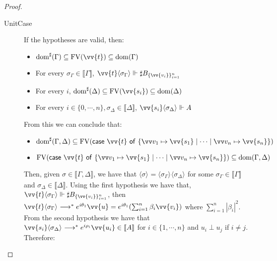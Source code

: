 \documentclass[runningheads,orivec,envcountsame,envcountsect]{llncs}
\newcommand\lra{\longrightarrow}
\newcommand\ansubst[2]{\ensuremath{\langle #1 \rangle_{#2}}}
\newcommand\dom[1]{\mathrm{dom}(#1)}
\newcommand\sdom[1]{\mathrm{dom}^{\sharp}(#1)}
\newcommand\FV[1]{\mathrm{FV}(#1)}
\def\gencase#1#2#3#4#5{\ensuremath{\mathsf{case}~#1~\mathsf{of}~\{#2\mapsto #4 \mid \dotsb \mid #3\mapsto #5\}}}
\def\eval{\lra^*}
\def\sem#1{\llbracket#1\rrbracket}
\def\real{\Vdash}
\newcommand\genbasis[3]{\ensuremath{B_{\{#1\}_{#2}^{#3}}}}
\begin{document}
\begin{proof}
\begin{description}
    \item[UnitCase] If the hypotheses are valid, then:
    \begin{itemize}
        \item $\sdom{\Gamma}\subseteq \FV{\vv{t}}\subseteq \dom{\Gamma}$
        \item For every $\sigma_\Gamma\in\sem{\Gamma}$, $\vv{t}\ansubst{\sigma_\Gamma}{}\real\sharp\genbasis{\vv{v_i}}{i=1}{n}$
        \item For every $i$, $\sdom{\Delta}\subseteq \FV{\vv{s_i}}\subseteq \dom{\Delta}$
        \item For every $i\in\{0,\dotsb ,n\}, \sigma_\Delta\in\sem{\Delta}$, $\vv{s_i}\ansubst{\sigma_\Delta}{}\real A$
    \end{itemize}
    
    From this we can conclude that:
    
    \begin{itemize}
        \item $\sdom{\Gamma,\Delta}\subseteq \FV{\gencase{\vv{t}}{\vv v_1}{\vv v_n}{\vv{s_1}}{\vv{s_n}}}$
        \item $\FV{\gencase{\vv{t}}{\vv v_1}{\vv v_n}{\vv{s_1}}{\vv{s_n}}}\subseteq \dom{\Gamma,\Delta}$
    \end{itemize}
    
    Then, given $\sigma\in\sem{\Gamma,\Delta}$, we have that $\ansubst{\sigma}{}=\ansubst{\sigma_\Gamma}{}\ansubst{\sigma_\Delta}{}$ for some $\sigma_\Gamma\in\sem{\Gamma}$ and $\sigma_\Delta\in\sem{\Delta}$. Using the first hypothesis we have that, $\vv{t}\ansubst{\sigma_\Gamma}{}\real\sharp\genbasis{\vv{v_i}}{i=1}{n}$, then $\vv{t}\ansubst{\sigma_\Gamma}{}\eval e^{i\theta_1} \vv{u}=e^{i\theta_1} (\sum_{i=1}^{n}\beta_i \vv{v_i})$ where $\sum_{i=1}^{n}|\beta_i|^2$. From the second hypothesis we have that $\vv{s_i}\ansubst{\sigma_\Delta}{}\eval e^{i\rho_i} \vv{u_i}\in\sem{A}$ for $i\in\{1,\dotsb ,n\}$ and $u_i\perp u_j$ if $i\neq j$. Therefore:


\end{description}
\end{proof}
\end{document}
